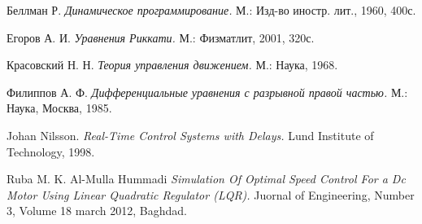  Беллман Р. \textit{Динамическое программирование.} М.: Изд-во иностр. лит., 1960, 400с.

 Егоров А. И. \textit{Уравнения Риккати.} М.: Физматлит, 2001, 320с.

 Красовский Н. Н. \textit{Теория управления движением.} М.: Наука, 1968.

 Филиппов А. Ф. \textit{Дифференциальные уравнения с разрывной правой частью.} М.: Наука, Москва, 1985.

\bibitem{} Johan Nilsson. \textit{Real-Time Control Systems with Delays.} Lund Institute of Technology, 1998.

 Ruba M. K. Al-Mulla Hummadi \textit{Simulation Of Optimal Speed Control For a Dc Motor Using Linear Quadratic Regulator (LQR).} Juornal of Engineering, Number 3, Volume 18 march 2012, Baghdad.